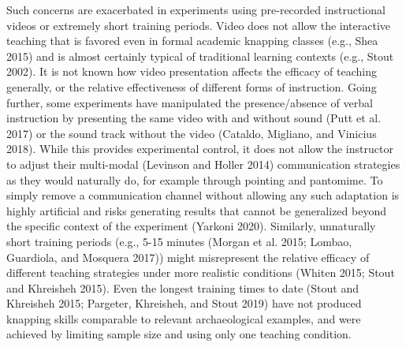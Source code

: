 \documentclass[smallextended]{svjour3}       %
\begin{document}
Such concerns are exacerbated in experiments using pre-recorded
instructional videos or extremely short training periods. Video does not
allow the interactive teaching that is favored even in formal academic
knapping classes (e.g., Shea 2015) and is almost certainly typical of
traditional learning contexts (e.g., Stout 2002). It is not known how
video presentation affects the efficacy of teaching generally, or the
relative effectiveness of different forms of instruction. Going further,
some experiments have manipulated the presence/absence of verbal
instruction by presenting the same video with and without sound (Putt et
al. 2017) or the sound track without the video (Cataldo, Migliano, and
Vinicius 2018). While this provides experimental control, it does not
allow the instructor to adjust their multi-modal (Levinson and Holler
2014) communication strategies as they would naturally do, for example
through pointing and pantomime. To simply remove a communication channel
without allowing any such adaptation is highly artificial and risks
generating results that cannot be generalized beyond the specific
context of the experiment (Yarkoni 2020). Similarly, unnaturally short
training periods (e.g., 5-15 minutes (Morgan et al. 2015; Lombao,
Guardiola, and Mosquera 2017)) might misrepresent the relative efficacy
of different teaching strategies under more realistic conditions (Whiten
2015; Stout and Khreisheh 2015). Even the longest training times to date
(Stout and Khreisheh 2015; Pargeter, Khreisheh, and Stout 2019) have not
produced knapping skills comparable to relevant archaeological examples,
and were achieved by limiting sample size and using only one teaching
condition.
\end{document}
